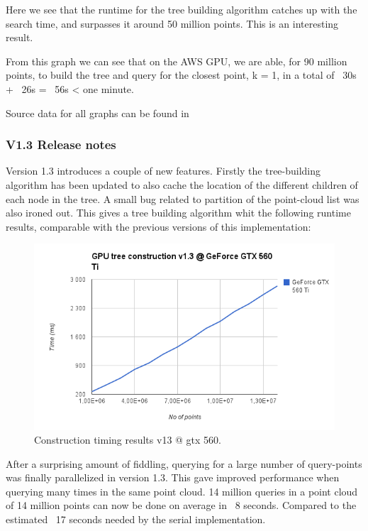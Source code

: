 \begin{enumerate}
\begin{enumerate}
Here we see that the runtime for the tree building algorithm catches up with the search time, and surpasses it around 50 million points. This is an interesting result.

From this graph we can see that on the AWS GPU, we are able, for 90 million points, to build the tree and query for the closest point, k = 1, in a total of ~30s + ~26s = ~56s < one minute.

Source data for all graphs can be found in 


\subsubsection{V1.3 Release notes} %
\label{ssub:v13_release_notes}

Version 1.3 introduces a couple of new features. Firstly the tree-building algorithm has been updated to also cache the location of the different children of each node in the tree. A small bug related to partition of the point-cloud list was also ironed out. This gives a tree building algorithm whit the following runtime results, comparable with the previous versions of this implementation:

\begin{figure}[ht!]
\centering
\includegraphics[width=120mm]{gfx/construction_v13_gtx_560.png}

\caption{Construction timing results v13 @ gtx 560.}
\label{fig:construction_v13_gtx_560}
\end{figure}

After a surprising amount of fiddling, querying for a large number of query-points was finally parallelized in version 1.3. This gave improved performance when querying many times in the same point cloud. 14 million queries in a point cloud of 14 million points can now be done on average in ~8 seconds. Compared to the estimated ~17 seconds needed by the serial implementation.


\end{enumerate}
\end{enumerate}
